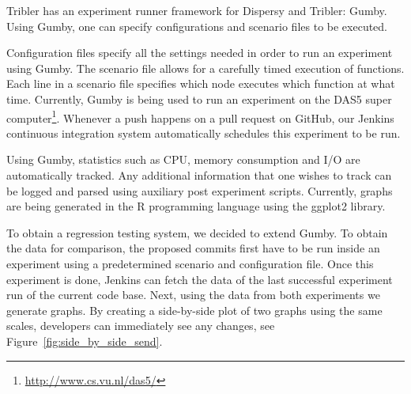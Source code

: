 Tribler has an experiment runner framework for Dispersy and Tribler: Gumby.
Using Gumby, one can specify configurations and scenario files to be executed.

Configuration files specify all the settings needed in order to run an experiment using Gumby.
The scenario file allows for a carefully timed execution of functions.
Each line in a scenario file specifies which node executes which function at what time. 
Currently, Gumby is being used to run an experiment on the DAS5 super computer\footnote{\url{http://www.cs.vu.nl/das5/}}.
Whenever a push happens on a pull request on GitHub, our Jenkins continuous integration system automatically schedules this experiment to be run.

Using Gumby, statistics such as CPU, memory consumption and I/O are automatically tracked.
Any additional information that one wishes to track can be logged and parsed using auxiliary post experiment scripts.
Currently, graphs are being generated in the R programming language using the ggplot2 library.

To obtain a regression testing system, we decided to extend Gumby.
To obtain the data for comparison, the proposed commits first have to be run inside an experiment using a predetermined scenario and configuration file.
Once this experiment is done, Jenkins can fetch the data of the last successful experiment run of the current code base.
Next, using the data from both experiments we generate graphs.
By creating a side-by-side plot of two graphs using the same scales, developers can immediately see any changes, see Figure~\ref{fig:side_by_side_send}.